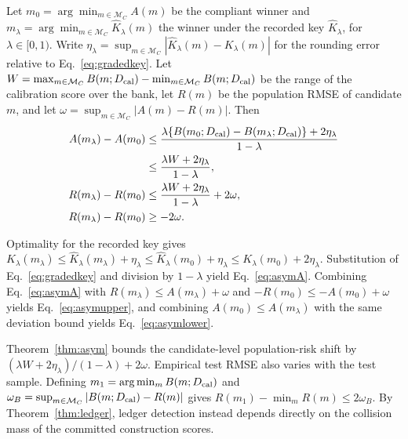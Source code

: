 \begin{theorem}\label{thm:asym}
\ifdefined\ReviewVersion\mbox{}\par\fi
Let \(m_0=\arg\min_{m\in\mathcal M_C} A(m)\) be the compliant winner and \(m_\lambda=\arg\min_{m\in\mathcal M_C}\widehat K_\lambda(m)\) the winner under the recorded key \(\widehat K_\lambda\), for \(\lambda\in[0,1)\). Write \(\eta_\lambda=\sup_{m\in\mathcal M_C}|\widehat K_\lambda(m)-K_\lambda(m)|\) for the rounding error relative to Eq.~\eqref{eq:gradedkey}. Let \(W=\max_{m\in\mathcal M_C} B(m;D_{\rm cal})-\min_{m\in\mathcal M_C} B(m;D_{\rm cal})\) be the range of the calibration score over the bank, let \(R(m)\) be the population RMSE of candidate \(m\), and let \(\omega=\sup_{m\in\mathcal M_C}|A(m)-R(m)|\). Then
\begin{align}
A(m_\lambda)-A(m_0)&\le\frac{\lambda\{B(m_0;D_{\rm cal})-B(m_\lambda;D_{\rm cal})\}+2\eta_\lambda}{1-\lambda}\notag\\
&\le\frac{\lambda W+2\eta_\lambda}{1-\lambda},\label{eq:asymA}\\
R(m_\lambda)-R(m_0)&\le\frac{\lambda W+2\eta_\lambda}{1-\lambda}+2\omega,\label{eq:asymupper}\\
R(m_\lambda)-R(m_0)&\ge-2\omega.\label{eq:asymlower}
\end{align}
\end{theorem}

\begin{pf}
Optimality for the recorded key gives \(K_\lambda(m_\lambda)\le\widehat K_\lambda(m_\lambda)+\eta_\lambda\le\widehat K_\lambda(m_0)+\eta_\lambda\le K_\lambda(m_0)+2\eta_\lambda\). Substitution of Eq.~\eqref{eq:gradedkey} and division by \(1-\lambda\) yield Eq.~\eqref{eq:asymA}. Combining Eq.~\eqref{eq:asymA} with \(R(m_\lambda)\le A(m_\lambda)+\omega\) and \(-R(m_0)\le -A(m_0)+\omega\) yields Eq.~\eqref{eq:asymupper}, and combining \(A(m_0)\le A(m_\lambda)\) with the same deviation bound yields Eq.~\eqref{eq:asymlower}.
\end{pf}

Theorem~\ref{thm:asym} bounds the candidate-level population-risk shift by \((\lambda W+2\eta_\lambda)/(1-\lambda)+2\omega\). Empirical test RMSE also varies with the test sample. Defining \(m_1=\arg\min_m B(m;D_{\rm cal})\) and \(\omega_B=\sup_{m\in\mathcal M_C}|B(m;D_{\rm cal})-R(m)|\) gives \(R(m_1)-\min_m R(m)\le2\omega_B\). By Theorem~\ref{thm:ledger}, ledger detection instead depends directly on the collision mass of the committed construction scores.
